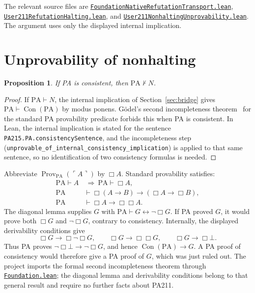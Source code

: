 \documentclass[11pt,letterpaper]{article}
\newtheorem{proposition}[theorem]{Proposition}
\newcommand{\PA}{\mathrm{PA}}
\newcommand{\Con}{\operatorname{Con}}
\newcommand{\Prov}{\operatorname{Prov}}
\newcommand{\code}[1]{\ulcorner #1\urcorner}
\newcommand{\src}[2]{\href{https://github.com/jamesyc/BusyBeaver/blob/main/#1}{\texttt{\nolinkurl{#2}}}}
\newcommand{\repo}[1]{\texttt{\nolinkurl{#1}}}
\begin{document}
The relevant source files are
\src{Lean/metamathematics/PA215PA/FoundationNativeRefutationTransport.lean}{FoundationNativeRefutationTransport.lean},
\src{Lean/metamathematics/User211RefutationHalting.lean}{User211RefutationHalting.lean},
and \src{Lean/metamathematics/User211NonhaltingUnprovability.lean}{User211NonhaltingUnprovability.lean}.
The argument uses only the displayed internal implication.

\section{Unprovability of nonhalting}\label{sec:first-side}

\begin{proposition}\label{prop:first}
If PA is consistent, then $\PA\nvdash N$.
\end{proposition}
\begin{proof}
If $\PA\vdash N$, the internal implication of
Section~\ref{sec:bridge} gives $\PA\vdash\Con(\PA)$ by modus ponens.
G\"odel's second incompleteness theorem~\cite{goedel} for the standard PA
provability predicate forbids this when PA is consistent. In Lean, the
internal implication is stated for the sentence
\repo{PA215.PA.consistencySentence}, and the incompleteness step
(\repo{unprovable_of_internal_consistency_implication}) is applied to
that same sentence, so no identification of two consistency formulas is
needed.
\end{proof}

Abbreviate
$\Prov_{\PA}(\code A)$ by $\Box A$. Standard provability satisfies:
\begin{align*}
\PA\vdash A&\ \Longrightarrow\ \PA\vdash\Box A,\\
\PA&\vdash\Box(A\to B)\to(\Box A\to\Box B),\\
\PA&\vdash\Box A\to\Box\Box A.
\end{align*}
The diagonal lemma supplies $G$ with
$\PA\vdash G\leftrightarrow\neg\Box G$. If PA proved $G$, it would
prove both $\Box G$ and $\neg\Box G$, contrary to consistency.
Internally, the displayed derivability conditions give
\[
\Box G\to\Box\neg\Box G,\qquad
\Box G\to\Box\Box G,\qquad
\Box G\to\Box\bot.
\]
Thus PA proves $\neg\Box\bot\to\neg\Box G$, and hence
$\Con(\PA)\to G$. A PA proof of consistency would therefore give a
PA proof of $G$, which was just ruled out. The project imports the
formal second incompleteness theorem through
\src{Lean/metamathematics/PA215PA/Foundation.lean}{Foundation.lean};
the diagonal lemma and derivability conditions belong to that general
result and require no further facts about PA211.
\end{document}
